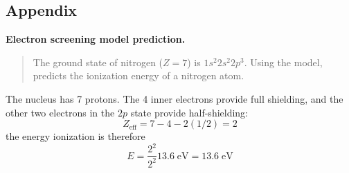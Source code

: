 \documentclass[../../main.tex]{subfiles}
\begin{document}
\subsection{Appendix}
\textbf{Electron screening model prediction.} 
\begin{quote}
    The ground state of nitrogen ($Z = 7$) is $1s^2 2s^2 2p^3$. Using the model, predicts the ionization energy of a nitrogen atom.
\end{quote}
The nucleus has 7 protons. The 4 inner electrons provide full shielding, and the other two electrons in the $2p$ state provide half-shielding:
\begin{equation*}
    Z_{\text{eff}}=7-4-2(1/2)=2
\end{equation*}
the energy ionization is therefore
\begin{equation*}
    E=\frac{2^2}{2^2}13.6\;\text{eV}=13.6\;\text{eV}
\end{equation*}
\end{document}
